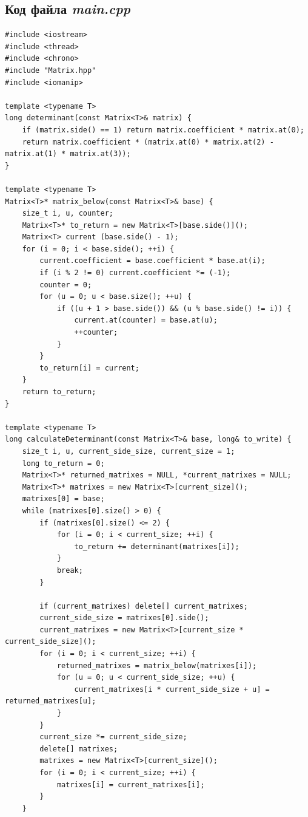 \documentclass[a4paper, 12pt]{article}
\begin{document}
\renewcommand\thesubsection{B.1}

\subsection{Код файла \textit{main.cpp}}

\fontsize{9}{9}\selectfont
\begin{verbatim}
#include <iostream>
#include <thread>
#include <chrono>
#include "Matrix.hpp"
#include <iomanip>

template <typename T>
long determinant(const Matrix<T>& matrix) {
    if (matrix.side() == 1) return matrix.coefficient * matrix.at(0);
    return matrix.coefficient * (matrix.at(0) * matrix.at(2) - matrix.at(1) * matrix.at(3));
}

template <typename T>
Matrix<T>* matrix_below(const Matrix<T>& base) {
    size_t i, u, counter;
    Matrix<T>* to_return = new Matrix<T>[base.side()]();
    Matrix<T> current (base.side() - 1);
    for (i = 0; i < base.side(); ++i) {
        current.coefficient = base.coefficient * base.at(i);
        if (i % 2 != 0) current.coefficient *= (-1);
        counter = 0;
        for (u = 0; u < base.size(); ++u) {
            if ((u + 1 > base.side()) && (u % base.side() != i)) {
                current.at(counter) = base.at(u);
                ++counter;
            }
        }
        to_return[i] = current;
    }
    return to_return;
}

template <typename T>
long calculateDeterminant(const Matrix<T>& base, long& to_write) {
    size_t i, u, current_side_size, current_size = 1;
    long to_return = 0;
    Matrix<T>* returned_matrixes = NULL, *current_matrixes = NULL;
    Matrix<T>* matrixes = new Matrix<T>[current_size]();
    matrixes[0] = base;
    while (matrixes[0].size() > 0) {
        if (matrixes[0].size() <= 2) {
            for (i = 0; i < current_size; ++i) {
                to_return += determinant(matrixes[i]);
            }
            break;
        }

        if (current_matrixes) delete[] current_matrixes;
        current_side_size = matrixes[0].side();
        current_matrixes = new Matrix<T>[current_size * current_side_size]();
        for (i = 0; i < current_size; ++i) {
            returned_matrixes = matrix_below(matrixes[i]);
            for (u = 0; u < current_side_size; ++u) {
                current_matrixes[i * current_side_size + u] = returned_matrixes[u];
            }
        }
        current_size *= current_side_size;
        delete[] matrixes;
        matrixes = new Matrix<T>[current_size]();
        for (i = 0; i < current_size; ++i) {
            matrixes[i] = current_matrixes[i];
        }
    }


\end{verbatim}
\end{document}
